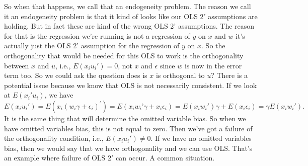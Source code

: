 \documentclass[11pt,a4paper]{amsart}
\theoremstyle{plain}
\theoremstyle{definition}
\begin{document}
 		 So when that happens, we call that an endogeneity problem. The reason we call it an endogeneity problem is that it kind of looks like our OLS $2'$ assumptions are holding. But in fact these are kind of the wrong OLS 2' assumptions. The reason for that is the regression we're running is not a regression of $y$ on $x$ and $w$ it's actually just the OLS 2' assumption for the regression of $y$ on $x$. So the orthogonality that would be needed for this OLS to work is the orthogonality between $x$ and $u$, i.e., $E(x_{i}u_{i}') = 0$, not $x$ and $\epsilon$ since $w$ is now in the error term too. So we could ask the question does is $x$ is orthogonal to $u$? There is a potential issue because we know that OLS is not necessarily consistent. If we look at $E(x_{i}'u_{i})$, we have 
 		 \[	E(x_{i}u_{i}')  = E(x_{i}(w_{i}\gamma + \epsilon_{i})^{'}) = E(x_{i}w_{i}’\gamma +x_{i} \epsilon_{i}) = E(x_{i}w_{i}')\gamma + E(x_{i} \epsilon_{i}) =  \gamma E(x_{i}w_{i}').	\]
 		 It is the same thing that will determine the omitted variable bias. So when we have omitted variables bias, this is not equal to zero. Then we've got a failure of the orthogonality condition, i.e., $E(x_{i}u_{i}') \ne 0$. If we have no omitted variables bias, then we would say that we have orthogonality and we can use OLS.  That's an example where failure of OLS $2'$ can occur. A common situation.
\end{document}
